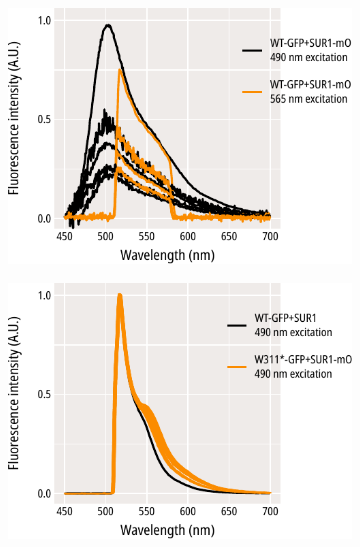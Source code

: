 \begin{figure}[h]
\begin{subfigure}[t]{0.3\textwidth}
		\includegraphics[width=\textwidth]{wt_gfp_mo_spectra_2.pdf}
	\end{subfigure}
	\vfill
	\begin{subfigure}[t]{0.3\textwidth}
		\caption{}\label{ch6fig:w311_gfp_mo_spectra_1}
		\centering
		\includegraphics[width=\textwidth]{w311_gfp_mo_spectra_1.pdf}
	\end{subfigure}
	\hfill
	\begin{subfigure}[t]{0.3\textwidth}
		\caption{}\label{ch6fig:w311_gfp_mo_spectra_2}
		\centering

\end{subfigure}
\end{figure}
